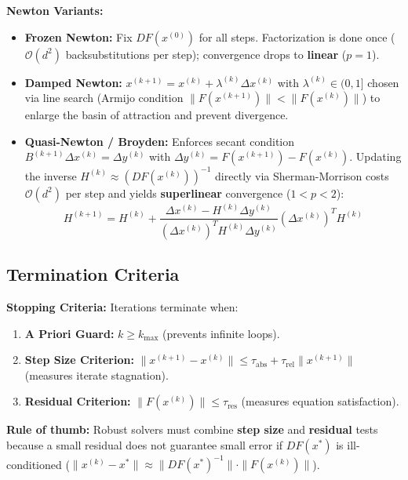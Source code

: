 \begin{remark}
    \textbf{Newton Variants:}
    \begin{itemize}
        \item \textbf{Frozen Newton:} Fix $DF(x^{(0)})$ for all steps. Factorization is done once ($\mathcal{O}(d^2)$ backsubstitutions per step); convergence drops to \textbf{linear} ($p = 1$).
        \item \textbf{Damped Newton:} $x^{(k+1)} = x^{(k)} + \lambda^{(k)} \Delta x^{(k)}$ with $\lambda^{(k)} \in (0, 1]$ chosen via line search (Armijo condition $\|F(x^{(k+1)})\| < \|F(x^{(k)})\|$) to enlarge the basin of attraction and prevent divergence.
        \item \textbf{Quasi-Newton / Broyden:} Enforces secant condition $B^{(k+1)}\Delta x^{(k)} = \Delta y^{(k)}$ with $\Delta y^{(k)} = F(x^{(k+1)}) - F(x^{(k)})$. Updating the inverse $H^{(k)} \approx (DF(x^{(k)}))^{-1}$ directly via Sherman-Morrison costs $\mathcal{O}(d^2)$ per step and yields \textbf{superlinear} convergence ($1 < p < 2$):
        $$
            H^{(k+1)} = H^{(k)} + \frac{\Delta x^{(k)} - H^{(k)} \Delta y^{(k)}}{(\Delta x^{(k)})^T H^{(k)} \Delta y^{(k)}} (\Delta x^{(k)})^T H^{(k)}
        $$
    \end{itemize}
\end{remark}

\subsection{Termination Criteria}

\begin{important}
    \textbf{Stopping Criteria:} Iterations terminate when:
    \begin{enumerate}
        \item \textbf{A Priori Guard:} $k \ge k_{\max}$ (prevents infinite loops).
        \item \textbf{Step Size Criterion:} $\|x^{(k+1)} - x^{(k)}\| \le \tau_{\text{abs}} + \tau_{\text{rel}} \|x^{(k+1)}\|$ (measures iterate stagnation).
        \item \textbf{Residual Criterion:} $\|F(x^{(k)})\| \le \tau_{\text{res}}$ (measures equation satisfaction).
    \end{enumerate}
    \textbf{Rule of thumb:} Robust solvers must combine \textbf{step size} and \textbf{residual} tests because a small residual does not guarantee small error if $DF(x^*)$ is ill-conditioned ($\|x^{(k)} - x^*\| \approx \|DF(x^*)^{-1}\| \cdot \|F(x^{(k)})\|$).
\end{important}

